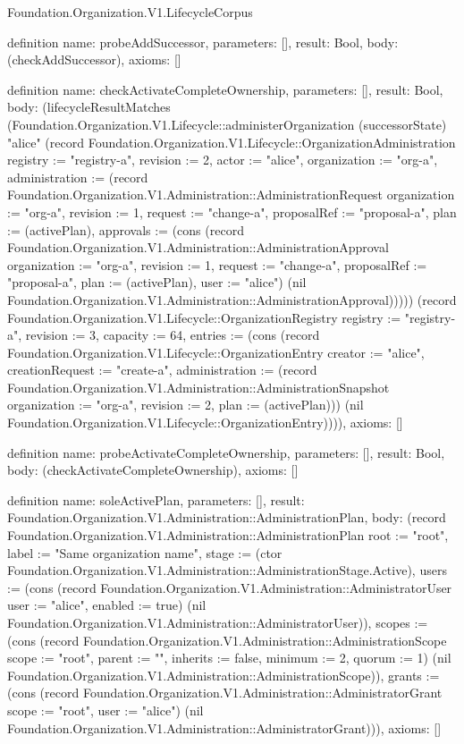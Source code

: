 \begin{lexlean}{Foundation.Organization.V1.LifecycleCorpus}
\begin{semanticmodule}
definition{
  name: probeAddSuccessor,
  parameters: [],
  result: Bool,
  body: (checkAddSuccessor),
  axioms: []
}

definition{
  name: checkActivateCompleteOwnership,
  parameters: [],
  result: Bool,
  body: (lifecycleResultMatches (Foundation.Organization.V1.Lifecycle::administerOrganization (successorState) "alice" (record Foundation.Organization.V1.Lifecycle::OrganizationAdministration {registry := "registry-a", revision := 2, actor := "alice", organization := "org-a", administration := (record Foundation.Organization.V1.Administration::AdministrationRequest {organization := "org-a", revision := 1, request := "change-a", proposalRef := "proposal-a", plan := (activePlan), approvals := (cons (record Foundation.Organization.V1.Administration::AdministrationApproval {organization := "org-a", revision := 1, request := "change-a", proposalRef := "proposal-a", plan := (activePlan), user := "alice"}) (nil Foundation.Organization.V1.Administration::AdministrationApproval))})})) (record Foundation.Organization.V1.Lifecycle::OrganizationRegistry {registry := "registry-a", revision := 3, capacity := 64, entries := (cons (record Foundation.Organization.V1.Lifecycle::OrganizationEntry {creator := "alice", creationRequest := "create-a", administration := (record Foundation.Organization.V1.Administration::AdministrationSnapshot {organization := "org-a", revision := 2, plan := (activePlan)})}) (nil Foundation.Organization.V1.Lifecycle::OrganizationEntry))})),
  axioms: []
}

definition{
  name: probeActivateCompleteOwnership,
  parameters: [],
  result: Bool,
  body: (checkActivateCompleteOwnership),
  axioms: []
}

definition{
  name: soleActivePlan,
  parameters: [],
  result: Foundation.Organization.V1.Administration::AdministrationPlan,
  body: (record Foundation.Organization.V1.Administration::AdministrationPlan {root := "root", label := "Same organization name", stage := (ctor Foundation.Organization.V1.Administration::AdministrationStage.Active), users := (cons (record Foundation.Organization.V1.Administration::AdministratorUser {user := "alice", enabled := true}) (nil Foundation.Organization.V1.Administration::AdministratorUser)), scopes := (cons (record Foundation.Organization.V1.Administration::AdministrationScope {scope := "root", parent := "", inherits := false, minimum := 2, quorum := 1}) (nil Foundation.Organization.V1.Administration::AdministrationScope)), grants := (cons (record Foundation.Organization.V1.Administration::AdministratorGrant {scope := "root", user := "alice"}) (nil Foundation.Organization.V1.Administration::AdministratorGrant))}),
  axioms: []
}


\end{semanticmodule}
\end{lexlean}
